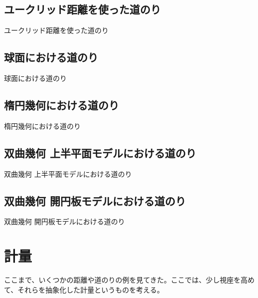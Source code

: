 \newpage

\subsection{ ユークリッド距離を使った道のり }

ユークリッド距離を使った道のり

\newpage


\subsection{ 球面における道のり }

球面における道のり

\newpage


\subsection{ 楕円幾何における道のり }

楕円幾何における道のり

\newpage


\subsection{ 双曲幾何 上半平面モデルにおける道のり }

双曲幾何 上半平面モデルにおける道のり

\newpage


\subsection{ 双曲幾何 開円板モデルにおける道のり }

双曲幾何 開円板モデルにおける道のり

\newpage


\section{ 計量 }

ここまで、いくつかの距離や道のりの例を見てきた。ここでは、少し視座を高めて、それらを抽象化した計量というものを考える。

